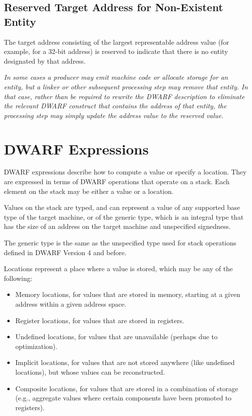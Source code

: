 \bb
{}
\subsection{Reserved Target Address for Non-Existent Entity}
\label{chap:reservedtargetaddress}
The target address consisting of the largest representable address
value (for example, \xffffffff{} for a 32-bit address) is reserved to
indicate that there is no entity designated by that address.

\textit{In some cases a producer may emit machine code or allocate
storage for an entity, but a linker or other subsequent processing
step may remove that entity. In that case, rather than be required
to rewrite the DWARF description to eliminate the relevant DWARF
construct that contains the address of that entity, the processing
step may simply update the address value to the reserved value.}
\eb

\section{DWARF Expressions}
\label{chap:dwarfexpressions}

DWARF expressions describe how to compute a value or specify a
location. They are expressed in terms of DWARF operations that operate
on a stack. Each element on the stack may be either a value or a
location.

Values on the stack are typed, and can represent a value of any
supported base type of the target machine, or of the generic type,
which is an integral type that has the size of an address on the
target machine and unspecified signedness.

The generic type is the same as the unspecified type used for stack
operations defined in DWARF Version 4 and before.

Locations represent a place where a value is stored, which may be any
of the following:
\begin{itemize}
\item Memory locations, for values that are stored in memory, starting
  at a given address within a given address space.
\item Register locations, for values that are stored in registers.
\item Undefined locations, for values that are unavailable (perhaps
  due to optimization).
\item Implicit locations, for values that are not stored anywhere
  (like undefined locations), but whose values can be reconstructed.
\item Composite locations, for values that are stored in a combination
  of storage (e.g., aggregate values where certain components have
  been promoted to registers).
\end{itemize}

